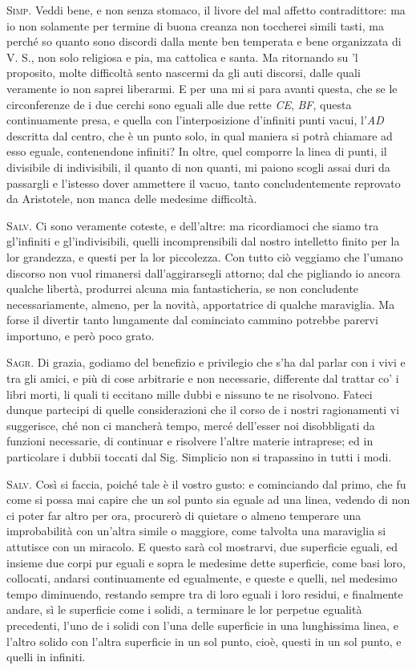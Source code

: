 \documentclass[11pt,twoside,openany]{book}
\newcommand{\speaker}[1]{\textcolor{rubric}{\textsc{#1}}\space}
\begin{document}
\speaker{Simp.} Veddi bene, e non senza stomaco, il livore del mal affetto contradittore: ma io non solamente per termine di buona creanza non toccherei simili tasti, ma perché so quanto sono discordi dalla mente ben temperata e bene organizzata di V. S., non solo religiosa e pia, ma cattolica e santa. Ma ritornando su 'l proposito, molte difficoltà sento nascermi da gli auti discorsi, dalle quali veramente io non saprei liberarmi. E per una mi si para avanti questa, che se le circonferenze de i due cerchi sono eguali alle due rette \emph{CE}, \emph{BF}, questa continuamente presa, e quella con l'interposizione d'infiniti punti vacui, l'\emph{AD} descritta dal centro, che è un punto solo, in qual maniera si potrà chiamare ad esso eguale, contenendone infiniti? In oltre, quel comporre la linea di punti, il divisibile di indivisibili, il quanto di non quanti, mi paiono scogli assai duri da passargli e l'istesso dover ammettere il vacuo, tanto concludentemente reprovato da Aristotele, non manca delle medesime difficoltà.

\speaker{Salv.} Ci sono veramente coteste, e dell'altre: ma ricordiamoci che siamo tra gl'infiniti e gl'indivisibili, quelli incomprensibili dal nostro intelletto finito per la lor grandezza, e questi per la lor piccolezza. Con tutto ciò veggiamo che l'umano discorso non vuol rimanersi dall'aggirarsegli attorno; dal che pigliando io ancora qualche libertà, produrrei alcuna mia fantasticheria, se non concludente necessariamente, almeno, per la novità, apportatrice di qualche maraviglia. Ma forse il divertir tanto lungamente dal cominciato cammino potrebbe parervi importuno, e però poco grato.

\speaker{Sagr.} Di grazia, godiamo del benefizio e privilegio che s'ha dal parlar con i vivi e tra gli amici, e più di cose arbitrarie e non necessarie, differente dal trattar co' i libri morti, li quali ti eccitano mille dubbi e nissuno te ne risolvono. Fateci dunque partecipi di quelle considerazioni che il corso de i nostri ragionamenti vi suggerisce, ché non ci mancherà tempo, mercé dell'esser noi disobbligati da funzioni necessarie, di continuar e risolvere l'altre materie intraprese; ed in particolare i dubbii toccati dal Sig. Simplicio non si trapassino in tutti i modi.

\speaker{Salv.} Così si faccia, poiché tale è il vostro gusto: e cominciando dal primo, che fu come si possa mai capire che un sol punto sia eguale ad una linea, vedendo di non ci poter far altro per ora, procurerò di quietare o almeno temperare una improbabilità con un'altra simile o maggiore, come talvolta una maraviglia si attutisce con un miracolo. E questo sarà col mostrarvi, due superficie eguali, ed insieme due corpi pur eguali e sopra le medesime dette superficie, come basi loro, collocati, andarsi continuamente ed egualmente, e queste e quelli, nel medesimo tempo diminuendo, restando sempre tra di loro eguali i loro residui, e finalmente andare, sì le superficie come i solidi, a terminare le lor perpetue egualità precedenti, l'uno de i solidi con l'una delle superficie in una lunghissima linea, e l'altro solido con l'altra superficie in un sol punto, cioè, questi in un sol punto, e quelli in infiniti.
\end{document}
